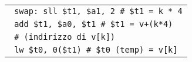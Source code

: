 \documentclass[../main.tex]{subfiles}
\begin{document}
\begin{tabular}{ l }
    \hline
    \hline
    \texttt{\hspace*{0cm} swap:\hspace*{0cm} sll \$t1, \$a1, 2 \hspace*{0cm} \hspace*{0cm} \hspace*{0cm} \# \$t1 = k * 4} \\
    \texttt{\hspace*{0cm} \hspace*{0cm} \hspace*{0cm} \hspace*{0cm} \hspace*{0cm} \hspace*{0cm} \hspace*{0cm} add \$t1, \$a0, \$t1 \hspace*{0cm} \# \$t1 = v+(k*4)} \\
    \texttt{\hspace*{0cm} \hspace*{0cm} \hspace*{0cm} \hspace*{0cm} \hspace*{0cm} \hspace*{0cm} \hspace*{0cm} \hspace*{0cm} \hspace*{0cm} \hspace*{0cm} \hspace*{0cm} \hspace*{0cm} \hspace*{0cm} \hspace*{0cm} \hspace*{0cm} \hspace*{0cm} \hspace*{0cm} \hspace*{0cm} \hspace*{0cm} \hspace*{0cm} \hspace*{0cm} \hspace*{0cm} \hspace*{0cm} \hspace*{0cm} \hspace*{0cm} \hspace*{0cm} \# \hspace*{0cm} \hspace*{0cm} (indirizzo di v[k])} \\
    \hline
    \hline
    \texttt{\hspace*{0cm} \hspace*{0cm} \hspace*{0cm} \hspace*{0cm} \hspace*{0cm} \hspace*{0cm} \hspace*{0cm} lw \$t0, 0(\$t1) \hspace*{0cm} \hspace*{0cm} \hspace*{0cm} \hspace*{0cm} \# \$t0 (temp) = v[k]} \\

\end{tabular}
\end{document}
